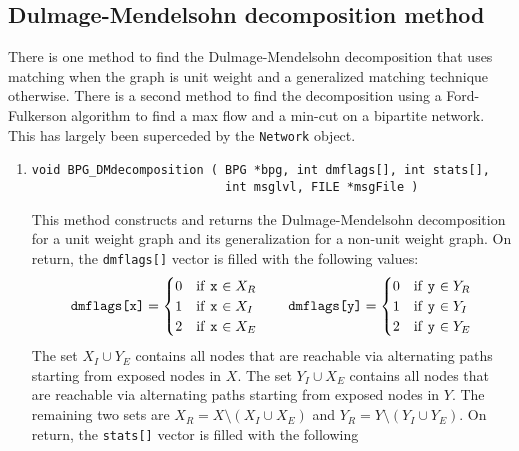 \subsection{Dulmage-Mendelsohn decomposition method}
\label{subsection:BPG:proto:DM}
\par
There is one method to find the Dulmage-Mendelsohn decomposition that
uses matching when the graph is unit weight and a generalized
matching technique otherwise.
There is a second method to find the decomposition using a
Ford-Fulkerson algorithm to find a max flow and a min-cut on a
bipartite network.
This has largely been superceded by the {\tt Network} object.
\par
\begin{enumerate}
\item
\begin{verbatim}
void BPG_DMdecomposition ( BPG *bpg, int dmflags[], int stats[],
                           int msglvl, FILE *msgFile )
\end{verbatim}
This method constructs and returns the Dulmage-Mendelsohn
decomposition for a unit weight graph and its generalization for a
non-unit weight graph.
On return, the {\tt dmflags[]} vector is filled with the following 
values:
\begin{displaymath}
\mbox{\tt dmflags[x]} =
\begin{cases}
0 & \text{if \texttt{x} $\in X_R$} \\
1 & \text{if \texttt{x} $\in X_I$} \\
2 & \text{if \texttt{x} $\in X_E$}
\end{cases}
\qquad
\mbox{\tt dmflags[y]} =
\begin{cases}
0 & \text{if \texttt{y} $\in Y_R$} \\
1 & \text{if \texttt{y} $\in Y_I$} \\
2 & \text{if \texttt{y} $\in Y_E$}
\end{cases}
\end{displaymath}
The set $X_I \cup Y_E$ contains all nodes that are reachable via
alternating paths starting from exposed nodes in $X$.
The set $Y_I \cup X_E$ contains all nodes that are reachable via
alternating paths starting from exposed nodes in $Y$.
The remaining two sets are $X_R = X \setminus (X_I \cup X_E)$
and $Y_R = Y \setminus (Y_I \cup Y_E)$.
On return, the {\tt stats[]} vector is filled with the following

\end{enumerate}

